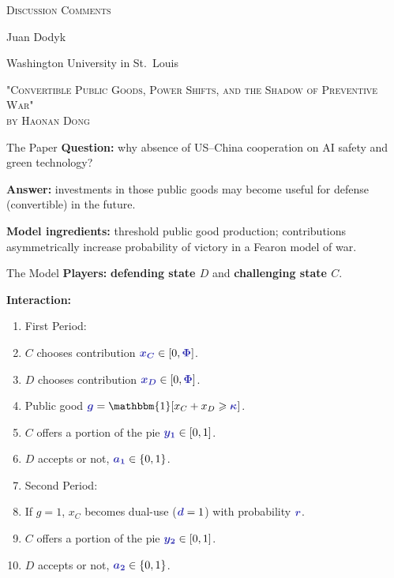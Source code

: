 \documentclass[ignorenonframetext,c,12pt]{beamer}
\providecommand{\tightlist}{%
  \setlength{\itemsep}{0pt}\setlength{\parskip}{0pt}}
\newcommand{\blue}[1]{{\color{blendedblue}#1}}
\newcommand{\bfblue}[1]{\textbf{\blue{#1}}}
\newcommand{\myemph}[1]{\bf{\blue{#1}}}
\def\1{\mathbbm{1}}
\def\ms{\medskip}
\renewcommand{\bf}[1]{{\boldsymbol{#1}}}
\let\geq=\geqslant %
\begin{document}
\begin{frame}{}
  \centering
  \blue{\textsc{\LARGE Discussion Comments}}\ms\ms
  
  {\large Juan Dodyk}\ms
    
  Washington University in St.\ Louis
\end{frame}

\begin{frame}{}
  \centering
  \blue{\textsc{\LARGE "Convertible Public Goods, Power Shifts, and the  Shadow of Preventive War" \\[0.5em] by Haonan Dong}}
\end{frame}

\begin{frame}{The Paper}
    \textbf{Question:} why absence of US--China cooperation on AI safety and green technology?

    \textbf{Answer:} investments in those public goods may become useful for defense (convertible) in the future.

    \textbf{Model ingredients:} threshold public good production; contributions asymmetrically increase probability of victory in a Fearon model of war.
\end{frame}

\begin{frame}{The Model}
  \textbf{Players:} \bfblue{defending state $D$} and \bfblue{challenging state $C$}.
  
  \textbf{Interaction:}\vspace{-0.25em}
  \begin{enumerate}\tightlist
    \item[] First Period:
    \item $C$ chooses contribution $\myemph{x_C} \in [0, \myemph{\Phi}]$.
    \item $D$ chooses contribution $\myemph{x_D} \in [0, \myemph{\Phi}]$.
    \item[] Public good $\myemph{g} = \1[x_C + x_D \geq \myemph{\kappa}]$.
    \item $C$ offers a portion of the pie $\myemph{y_1} \in [0, 1]$.
    \item $D$ accepts or not, $\myemph{a_1} \in \{0, 1\}$.\ms
    \item[] Second Period:
    \item[] If $g = 1$, $x_C$ becomes dual-use ($\myemph{d} = 1$) with probability $\myemph{r}$.
    \item $C$ offers a portion of the pie $\myemph{y_2} \in [0, 1]$.
    \item $D$ accepts or not, $\myemph{a_2} \in \{0, 1\}$.
  \end{enumerate}
\end{frame}
\end{document}
